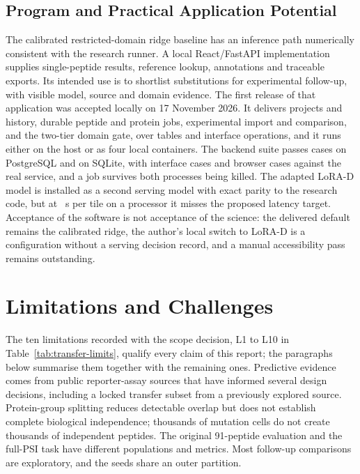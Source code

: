 \subsection{Program and Practical Application Potential}
The calibrated restricted-domain ridge baseline has an inference path numerically consistent with
the research runner. A local React/FastAPI implementation supplies single-peptide results, reference
lookup, annotations and traceable exports. Its intended use is to shortlist substitutions for
experimental follow-up, with visible model, source and domain evidence.
The first release of that application was accepted locally on 17 November 2026. It delivers
projects and history, durable peptide and protein jobs, experimental import and comparison, and the
two-tier domain gate, over \nAppTables{} tables and \nAppOperations{} interface operations, and it runs
either on the host or as four local containers. The backend suite passes \nAppDockerPgPassed{} cases
on PostgreSQL and \nAppDockerSqlitePassed{} on SQLite, with \nAppDockerVitest{} interface cases and
\nAppDockerReal{} browser cases against the real service, and a job survives both processes being
killed. The adapted LoRA-D model is installed as a second serving model with exact parity to the
research code, but at \nAppLoraLatPfive{}~s per tile on a processor it misses the proposed latency
target. Acceptance of the software is not acceptance of the science: the delivered default remains
the calibrated ridge, the author's local switch to LoRA-D is a configuration without a serving
decision record, and a manual accessibility pass remains outstanding.

\section{Limitations and Challenges}
The ten limitations recorded with the scope decision, L1 to L10 in Table~\ref{tab:transfer-limits},
qualify every claim of this report; the paragraphs below summarise them together with the remaining ones.
Predictive evidence comes from public reporter-assay sources that have informed several design
decisions, including a locked transfer subset from a previously explored source. Protein-group
splitting reduces detectable overlap but does not establish
complete biological independence; thousands of mutation cells do not create thousands of independent
peptides. The original 91-peptide evaluation and the full-PSI task have different populations and
metrics. Most follow-up comparisons are exploratory, and the seeds share an outer partition.


